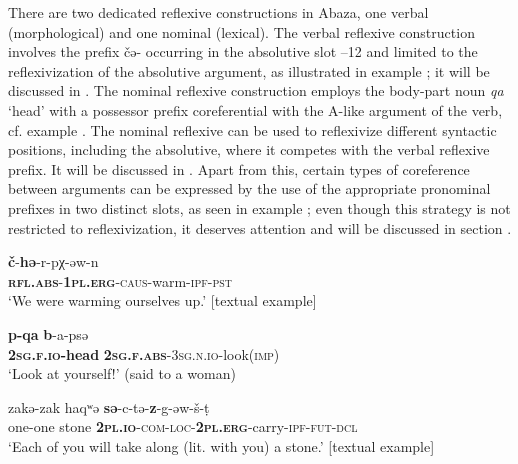 \documentclass[output=paper]{langscibook}
\begin{document}
There are two dedicated reflexive constructions in Abaza, one verbal (morphological) and one nominal (lexical). The verbal reflexive construction involves the prefix {č{ə}}{}- occurring in the absolutive slot –12 and limited to the reflexivization of the absolutive argument, as illustrated in example ; it will be discussed in . The %
%
%
%
nominal reflexive construction employs the body-part noun \textit{qa} ‘head’ with a possessor prefix coreferential with the A-like argument of the verb, cf. example . The %
%
nominal reflexive can be used to reflexivize different syntactic positions, including the absolutive, where it competes with the verbal reflexive prefix. It will be discussed in . Apart from this, certain types of coreference between arguments can be expressed by the use of the appropriate pronominal prefixes in two distinct slots, as seen in example ; even though this strategy is not restricted to reflexivization, it deserves attention and will be discussed in section .


\ea 
\label{ex:Arkadiev:12}
    \gll \textbf{{č}}{{}-}\textbf{{h{ə}}}{{}-r-pχ-{ə}w-n}\\
     \textbf{\textsc{rfl.abs}}\textsc{{}-}\textbf{\textsc{1pl.erg}}\textsc{{}-caus}{}-warm-\textsc{ipf-pst}\\
    \glt ‘We were warming ourselves up.’ [textual example]
\z

 
\ea 
\label{ex:Arkadiev:13}
    \gll \textbf{{p-qa}}  \textbf{{b}}{{}-a-ps{ə}}\\
    \textbf{\textsc{2sg.f.io}}\textbf{{}-head}  \textbf{\textsc{2sg.f.abs}}\textsc{{}-3sg.n.io}{}-look(\textsc{imp)}\\
    \glt‘Look at yourself!’ (said to a woman)
\z

\ea 
\label{ex:Arkadiev:14}
    \gll zak{ə}-zak haq{ʷ}{ə} \textbf{{s{ə}}}{{}-c-t{ə}-}\textbf{{z}}{{}-g-{ə}w-š-t{̣}}\\
    one-one stone \textbf{\textsc{2pl.io}}\textsc{{}-com-loc-}\textbf{\textsc{2pl.erg}}{}-carry-\textsc{ipf-fut-dcl}\\
    \glt ‘Each of you will take along (lit. with you) a stone.’ [textual example]
\z
\end{document}
